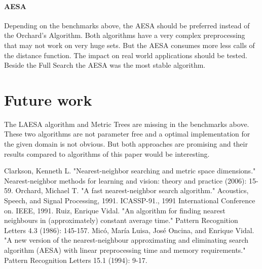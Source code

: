 \documentclass[runningheads,a4paper]{llncs}
\begin{document}
\paragraph{AESA} Depending on the benchmarks above, the AESA should be preferred instead of the Orchard’s Algorithm.
Both algorithms have a very complex preprocessing that may not work on very huge sets. But the AESA consumes more less
calls of the distance function. The impact on real world applications should be tested. Beside the Full Search the AESA
was the most stable algorithm.

\section{Future work}

The LAESA\cite{Vidal} algorithm and Metric Trees\cite{Clarkson} are missing in the benchmarks above. These two
algorithms are not parameter free and a optimal implementation for the given domain is not obvious. But both approaches
are promising and their results compared to algorithms of this paper would be interesting.

\begin{thebibliography}{4}
	 Clarkson, Kenneth L. "Nearest-neighbor searching and metric space dimensions." Nearest-neighbor
		methods for learning and vision: theory and practice (2006): 15-59.
	 Orchard, Michael T. "A fast nearest-neighbor search algorithm." Acoustics, Speech, and Signal
		Processing, 1991. ICASSP-91., 1991 International Conference on. IEEE, 1991.
	 Ruiz, Enrique Vidal. "An algorithm for finding nearest neighbours in (approximately) constant average
		time." Pattern Recognition Letters 4.3 (1986): 145-157.
	 Micó, María Luisa, José Oncina, and Enrique Vidal. "A new version of the nearest-neighbour
		approximating and eliminating search algorithm (AESA) with linear preprocessing time and memory requirements."
		Pattern Recognition Letters 15.1 (1994): 9-17.
\end{thebibliography}
\end{document}
